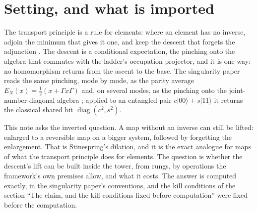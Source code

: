 \documentclass[11pt]{article}
\theoremstyle{definition}
\theoremstyle{plain}
\providecommand{\EN}{}\renewcommand{\EN}{E_{N}}
\providecommand{\G}{}\renewcommand{\G}{\Gamma}
\providecommand{\ket}{}\renewcommand{\ket}[1]{|#1\rangle}
\begin{document}
\noindent{}
\newpage

\section{Setting, and what is imported}

\label{c:note.descent-lift.setting-setting-what-imported}
The transport principle is a rule for elements: where an element has no inverse, adjoin the minimum that gives it one, and keep the descent that forgets the adjunction \cite[Thm.~4.13, Prop.~7.5, Thm.~7.6]{ButlerT1}. The descent is a conditional expectation, the pinching onto the algebra that commutes with the ladder's occupation projector, and it is one-way: no homomorphism returns from the ascent to the base. The singularity paper reads the same pinching, mode by mode, as the parity average $\EN(x) = \tfrac12(x + \G x\G)$ and, on several modes, as the pinching onto the joint-number-diagonal algebra \cite[Thm.~5.7, Prop.~9.6]{ButlerT5}; applied to an entangled pair $c\ket{00} + s\ket{11}$ it returns the classical shared bit $\operatorname{diag}(c^{2}, s^{2})$.

This note asks the inverted question. A map without an inverse can still be lifted: enlarged to a reversible map on a bigger system, followed by forgetting the enlargement. That is Stinespring's dilation, and it is the exact analogue for maps of what the transport principle does for elements. The question is whether the descent's lift can be built inside the tower, from rungs, by operations the framework's own premises allow, and what it costs. The answer is computed exactly, in the singularity paper's conventions, and the kill conditions of the section ``The claim, and the kill conditions fixed before computation'' were fixed before the computation.
\end{document}
